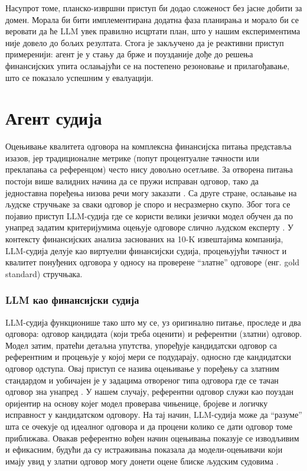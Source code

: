 Насупрот томе, планско-извршни приступ би додао сложеност без јасне добити за домен. Морала би бити имплементирана додатна фаза планирања и морало би се веровати да ће LLM увек правилно исцртати план, што у нашим експериментима није довело до бољих резултата. Стога је закључено да је реактивни приступ примеренији: агент је у стању да брже и поузданије дође до решења финансијских упита ослањајући се на постепено резоновање и прилагођавање, што се показало успешним у евалуацији.



\section{Агент судија}

Оцењивање квалитета одговора на комплексна финансијска питања представља изазов, јер традиционалне метрике (попут процентуалне тачности или преклапања са референцом) често нису довољно осетљиве. За отворена питања постоји више валидних начина да се пружи исправан одговор, тако да једноставна поређења низова речи могу заказати \cite{evidently_ai_llm_judge_2025}. Са друге стране, ослањање на људске стручњаке за сваки одговор је споро и несразмерно скупо. Због тога се појавио приступ LLM-судија где се користи велики језички модел обучен да по унапред задатим критеријумима оцењује одговоре слично људском експерту \cite{zheng_judging_llm_2023,evidently_ai_llm_judge_2025}. У контексту финансијских анализа заснованих на 10-K извештајима компанија, LLM-судија делује као виртуелни финансијски судија, процењујући тачност и квалитет понуђених одговора у односу на проверене ``златне'' одговоре (енг. gold standard) стручњака.

\subsubsection{LLM као финансијски судија}

LLM-судија функционише тако што му се, уз оригинално питање, проследе и два одговора: одговор кандидата (који треба оценити) и референтни (златни) одговор. Модел затим, пратећи детаљна упутства, упоређује кандидатски одговор са референтним и процењује у којој мери се подударају, односно где кандидатски одговор одступа. Овај приступ се назива оцењивање у поређењу са златним стандардом и уобичајен је у задацима отвореног типа одговора где се тачан одговор зна унапред \cite{evidently_ai_llm_judge_2025}. У нашем случају, референтни одговор служи као поуздан оријентир на основу којег модел проверава чињенице, бројеве и логичку исправност у кандидатском одговору. На тај начин, LLM-судија може да ``разуме'' шта се очекује од идеалног одговора и да процени колико се дати одговор томе приближава. Овакав референтно вођен начин оцењивања показује се изводљивим и ефикасним, будући да су истраживања показала да модели-оцењивачи који имају увид у златни одговор могу донети оцене блиске људским судовима \cite{zheng_judging_llm_2023}.

